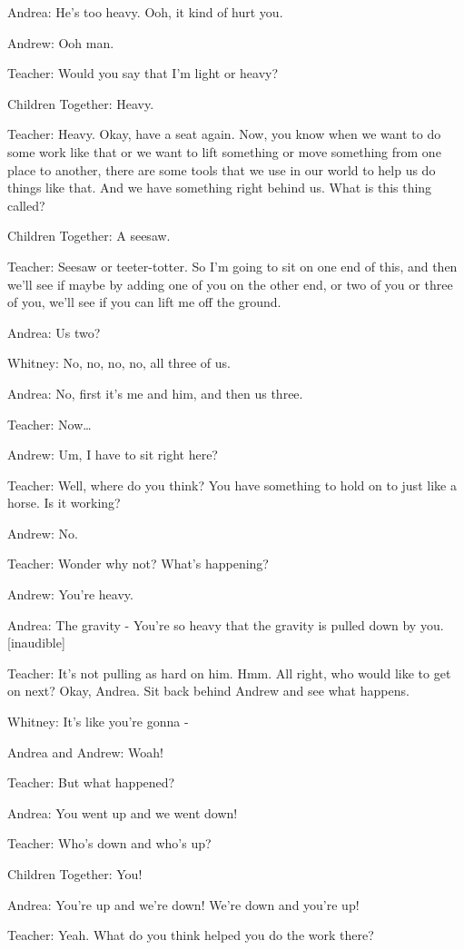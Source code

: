 Andrea: He's too heavy. Ooh, it kind of hurt you.

Andrew: Ooh man.

Teacher: Would you say that I'm light or heavy?

Children Together: Heavy.

Teacher: Heavy. Okay, have a seat again. Now, you know when we want to do some work like that or we want to lift something or move something from one place to another, there are some tools that we use in our world to help us do things like that. And we have something right behind us. What is this thing called?

Children Together: A seesaw.

Teacher: Seesaw or teeter-totter. So I'm going to sit on one end of this, and then we'll see if maybe by adding one of you on the other end, or two of you or three of you, we'll see if you can lift me off the ground.

Andrea: Us two?

Whitney: No, no, no, no, all three of us.

Andrea: No, first it's me and him, and then us three.

Teacher: Now\dots

Andrew: Um, I have to sit right here?

Teacher: Well, where do you think? You have something to hold on to just like a horse. Is it working?

Andrew: No.

Teacher: Wonder why not? What's happening?

Andrew: You're heavy.

Andrea: The gravity - You're so heavy that the gravity is pulled down by you. [inaudible]

Teacher: It's not pulling as hard on him. Hmm. All right, who would like to get on next? Okay, Andrea. Sit back behind Andrew and see what happens.

Whitney: It's like you're gonna -

Andrea and Andrew: Woah!

Teacher: But what happened?

Andrea: You went up and we went down!

Teacher: Who's down and who's up?

Children Together: You!

Andrea: You're up and we're down! We're down and you're up!

Teacher: Yeah. What do you think helped you do the work there?

